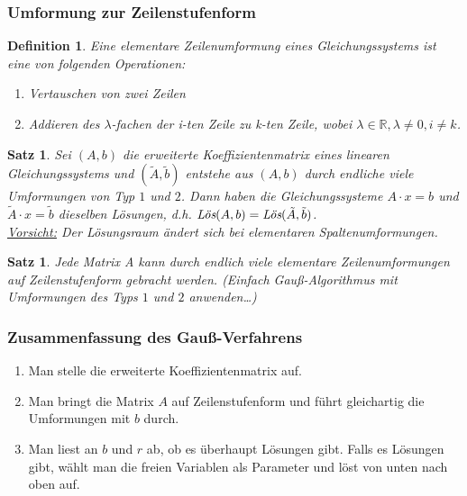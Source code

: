 \documentclass[12pt,a4paper]{article}
\theoremstyle{plain}
\newtheorem{Satz}[Theorem]{Satz}
\newtheorem{Definition}[Theorem]{Definition}
\newcommand{\R}{\mathbb{R}}
\numberwithin{equation}{section}
\begin{document}
\subsubsection{Umformung zur Zeilenstufenform}
\begin{Definition}
Eine elementare Zeilenumformung eines Gleichungssystems ist eine von folgenden Operationen: \begin{enumerate}
\renewcommand{\labelenumi}{\emph{\arabic{enumi}.}}
\item Vertauschen von zwei Zeilen
\item Addieren des $\lambda$-fachen der i-ten Zeile zu k-ten Zeile, wobei $\lambda\in\R,\lambda\neq 0,i\neq k$.
\end{enumerate}
\end{Definition}
\begin{Satz}
Sei $(A,b)$ die erweiterte Koeffizientenmatrix eines linearen Gleichungssystems und $(\tilde{A},\tilde{b})$ entstehe aus $(A,b)$ durch endliche viele Umformungen von Typ $1$ und $2$. Dann haben die Gleichungssysteme $A\cdot x=b$ und $\tilde{A}\cdot x=\tilde{b}$ dieselben Lösungen, d.h. $\emph{Lös}(A,b)=\emph{Lös}(\tilde{A},\tilde{b})$.\\
\underline{Vorsicht:} Der Lösungsraum ändert sich bei elementaren Spaltenumformungen.
\end{Satz}
\begin{Satz}
Jede Matrix A kann durch endlich viele elementare Zeilenumformungen auf Zeilenstufenform gebracht werden. (Einfach Gauß-Algorithmus mit Umformungen des Typs $1$ und $2$ anwenden\ldots)
\end{Satz}
\subsubsection{Zusammenfassung des Gauß-Verfahrens}
\begin{enumerate}
\item Man stelle die erweiterte Koeffizientenmatrix auf.
\item Man bringt die Matrix $A$ auf Zeilenstufenform und führt gleichartig die Umformungen mit $b$ durch.
\item Man liest an $b$ und $r$ ab, ob es überhaupt Lösungen gibt. Falls es Lösungen gibt, wählt man die freien Variablen als Parameter und löst von unten nach oben auf.
\end{enumerate}
\end{document}
